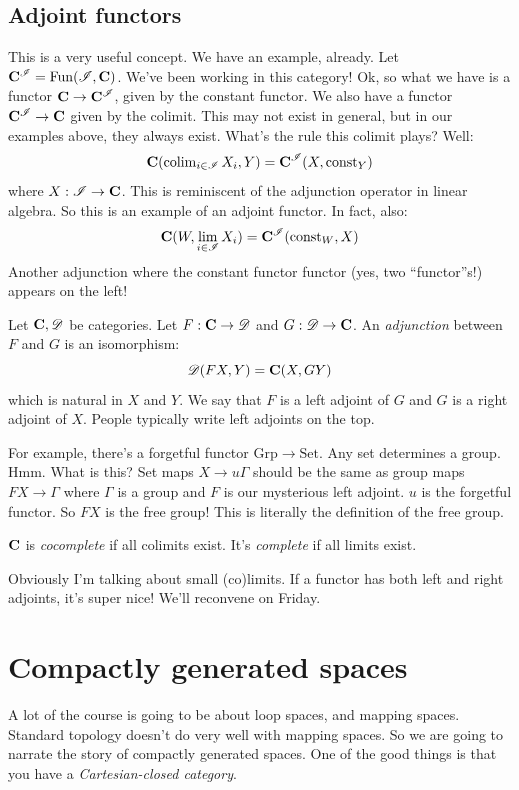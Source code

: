 \section{Adjoint functors}
This is a very useful concept. We have an example, already. Let $\mathbf C^\mathscr I = \operatorname{Fun}(\mathscr I,\mathbf C)$. We've been working in this category! Ok, so what we have is a functor $\mathbf C\to \mathbf C^\mathscr I$, given by the constant functor. We also have a functor $\mathbf C^\mathscr I\to \mathbf C$ given by the colimit. This may not exist in general, but in our examples above, they always exist. What's the rule this colimit plays? Well:
$$\mathbf C(\operatorname{colim}_{i\in \mathscr I} X_i,Y) = \mathbf C^\mathscr I(X,\mathrm{const}_Y)$$
where $X:\mathscr I\to\mathbf C$. This is reminiscent of the adjunction operator in linear algebra. So this is an example of an adjoint functor. In fact, also:
$$\mathbf C(W,\lim_{i\in \mathscr I} X_i) = \mathbf C^{\mathscr I}(\mathrm{const}_W,X)$$
Another adjunction where the constant functor functor (yes, two ``functor''s!) appears on the left!
\begin{definition}
    Let $\mathbf C,\mathscr D$ be categories. Let $F:\mathbf C\to \mathscr D$ and $G:\mathscr D\to\mathbf C$. An \emph{adjunction} between $F$ and $G$ is an isomorphism:
    $$\mathscr D(FX,Y) = \mathbf C(X,GY)$$
    which is natural in $X$ and $Y$. We say that $F$ is a left adjoint of $G$ and $G$ is a right adjoint of $X$. People typically write left adjoints on the top.
\end{definition}
For example, there's a forgetful functor $\mathrm{Grp}\to\mathrm{Set}$. Any set determines a group. Hmm. What is this? Set maps $X\to u\Gamma$ should be the same as group maps $FX\to \Gamma$ where $\Gamma$ is a group and $F$ is our mysterious left adjoint. $u$ is the forgetful functor. So $FX$ is the free group! This is literally the definition of the free group.
\begin{definition}
    $\mathbf C$ is \emph{cocomplete} if all colimits exist. It's \emph{complete} if all limits exist.
\end{definition}
Obviously I'm talking about small (co)limits. If a functor has both left and right adjoints, it's super nice! We'll reconvene on Friday.

\chapter{Compactly generated spaces}
A lot of the course is going to be about loop spaces, and mapping spaces. Standard topology doesn't do very well with mapping spaces. So we are going to narrate the story of compactly generated spaces. One of the good things is that you have a \emph{Cartesian-closed category}.

